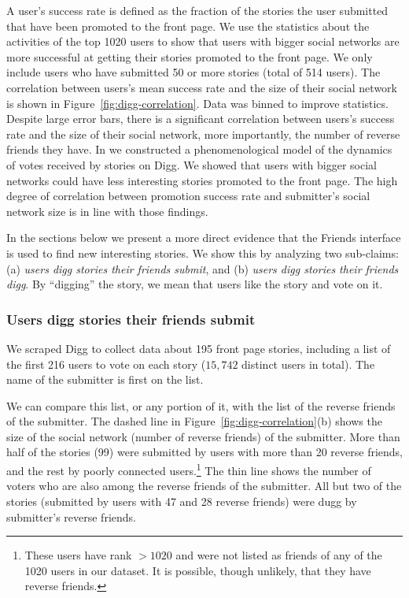 \documentclass[]{article}
\newcommand{\figref}[1]{Figure~\ref{#1}}
\begin{document}
 A user's success
rate is defined as the fraction of the stories the user submitted
that have been promoted to the front page. We use the statistics
about the activities of the top 1020 users to show that users with
bigger social networks are more successful at getting their stories
promoted to the front page. We only
include users who have submitted 50 or more stories (total of 514
users). The correlation between users's mean success rate and the size of their social
network is shown in \figref{fig:digg-correlation}. Data was binned to improve statistics. Despite large error
bars, there is a significant correlation between users's success rate and the size
of their social network, more importantly, the number of
reverse friends they have. In \cite{Lerman07ic} we constructed a
phenomenological model of the dynamics of votes received by stories
on Digg. We showed that users with bigger social networks could have
less interesting stories promoted to the front page. The high degree
of correlation between promotion success rate and submitter's social
network size is in line with those findings.

In the sections below we present a more direct evidence that the Friends interface
is used to find new interesting stories. We show this by analyzing two
sub-claims: (a) \emph{users digg stories their friends submit}, and
(b) \emph{users digg stories their friends digg}.
By ``digging'' the story, we mean that users like the story and vote on it.

\subsubsection{Users digg stories their friends submit} We scraped Digg to collect
data about 195 front page stories, including a list of the first 216 users to vote
on each story ($15,742$ distinct users in total). The name of the submitter
is first on the list.


We can compare this list, or any portion
of it, with the list of the reverse friends of the submitter.
The dashed line in \figref{fig:digg-correlation}(b) shows the size of the social
network (number of reverse friends) of the submitter. More than half
of the stories (99) were submitted by users with more than 20
reverse friends, and the rest by poorly connected users.\footnote{These users
have rank $>1020$ and were not listed as friends of any of the 1020
users in our dataset. It is possible, though unlikely, that they
have reverse friends.}
The thin line  shows the number of voters
who are also among the reverse friends of the submitter.
All but two of the stories (submitted by users with
47 and 28 reverse friends) were dugg by submitter's reverse friends.
\end{document}
